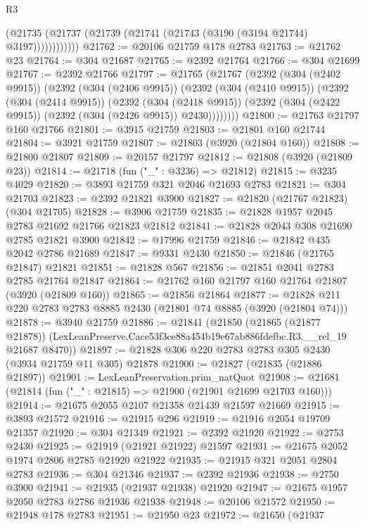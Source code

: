 \begin{lexlean}{R3}
\begin{coremodule}
                (@21735 (@21737 (@21739 (@21741 (@21743 (@3190 (@3194 @21744) @3197))))))))))))
@21762 := @20106 @21759 @178 @2783
@21763 := @21762 @23
@21764 := @304 @21687
@21765 := @2392 @21764
@21766 := @304 @21699
@21767 := @2392 @21766
@21797 := @21765
    (@21767
      (@2392
        (@304 (@2402 @9915))
        (@2392
          (@304 (@2406 @9915))
          (@2392
            (@304 (@2410 @9915))
            (@2392
              (@304 (@2414 @9915))
              (@2392
                (@304 (@2418 @9915))
                (@2392 (@304 (@2422 @9915)) (@2392 (@304 (@2426 @9915)) @2430))))))))
@21800 := @21763 @21797 @160 @21766
@21801 := @3915 @21759
@21803 := @21801 @160 @21744
@21804 := @3921 @21759
@21807 := @21803 (@3920 (@21804 @160))
@21808 := @21800 @21807
@21809 := @20157 @21797
@21812 := @21808 (@3920 (@21809 @23))
@21814 := @21718 (fun ("_" : @3236) => @21812)
@21815 := @3235 @4029
@21820 := @3893 @21759 @321 @2046 @21693 @2783
@21821 := @304 @21703
@21823 := @2392 @21821 @3900
@21827 := @21820 (@21767 @21823) (@304 @21705)
@21828 := @3906 @21759
@21835 := @21828 @1957 @2045 @2783 @21692 @21766 @21823 @21812
@21841 := @21828 @2043 @308 @21690 @2785 @21821 @3900
@21842 := @17996 @21759
@21846 := @21842 @435 @2042 @2786 @21689
@21847 := @9331 @2430
@21850 := @21846 (@21765 @21847) @21821
@21851 := @21828 @567
@21856 := @21851 @2041 @2783 @2785 @21764 @21847
@21864 := @21762 @160 @21797 @160 @21764 @21807 (@3920 (@21809 @160))
@21865 := @21856 @21864
@21877 := @21828 @211 @220 @2783 @2783 @8885 @2430 (@21801 @74 @8885 (@3920 (@21804 @74)))
@21878 := @3940 @21759
@21886 := @21841
    (@21850
      (@21865 (@21877 @21878))
      (LexLeanPreserve.Cace53f3ce88a454b19e67ab886fdefbc.R3.__rel_19 @21687 @8470))
@21897 := @21828 @306 @220 @2783 @2783 @305 @2430 (@3934 @21759 @11 @305) @21878
@21900 := @21827 (@21835 (@21886 @21897))
@21901 := LexLeanPreservation.prim_natQuot
@21908 := @21681 (@21814 (fun ("_" : @21815) => @21900 (@21901 @21699 @21703 @160)))
@21914 := @21675 @2055 @2107 @21358 @21439 @21597 @21669
@21915 := @3893 @21572
@21916 := @21915 @296
@21919 := @21916 @2054 @19709 @21357
@21920 := @304 @21349
@21921 := @2392 @21920
@21922 := @2753 @2430
@21925 := @21919 (@21921 @21922) @21597
@21931 := @21675 @2052 @1974 @2806 @2785 @21920 @21922
@21935 := @21915 @321 @2051 @2804 @2783
@21936 := @304 @21346
@21937 := @2392 @21936
@21938 := @2750 @3900
@21941 := @21935 (@21937 @21938) @21920
@21947 := @21675 @1957 @2050 @2783 @2786 @21936 @21938
@21948 := @20106 @21572
@21950 := @21948 @178 @2783
@21951 := @21950 @23
@21972 := @21650
    (@21937

\end{coremodule}
\end{lexlean}
